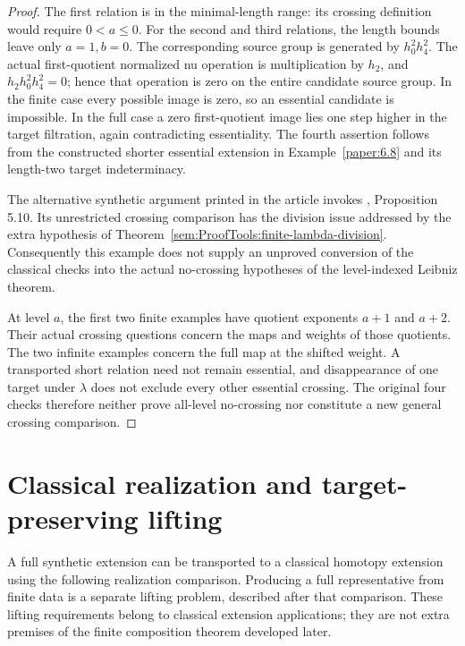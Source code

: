 \begin{proof}
The first relation is in the minimal-length range: its crossing definition would require $0<a\leq0$. For the second and third relations, the length bounds leave only $a=1,b=0$. The corresponding source group is generated by $h_0^2h_4^2$. The actual first-quotient normalized nu operation is multiplication by $h_2$, and $h_2h_0^2h_4^2=0$; hence that operation is zero on the entire candidate source group. In the finite case every possible image is zero, so an essential candidate is impossible. In the full case a zero first-quotient image lies one step higher in the target filtration, again contradicting essentiality. The fourth assertion follows from the constructed shorter essential extension in Example~\ref{paper:6.8} and its length-two target indeterminacy.

The alternative synthetic argument printed in the article invokes
\cite{LWX126}, Proposition 5.10. Its unrestricted crossing comparison
has the division issue addressed by the extra hypothesis of
Theorem~\ref{sem:ProofTools:finite-lambda-division}. Consequently this
example does not supply an unproved conversion of the classical checks
into the actual no-crossing hypotheses of the level-indexed Leibniz theorem.

At level $a$, the first two finite examples have quotient exponents
$a+1$ and $a+2$. Their actual crossing questions concern the maps
and weights of those quotients. The two infinite examples concern
the full map at the shifted weight. A transported short relation
need not remain essential, and disappearance of one target under
$\lambda$ does not exclude every other essential crossing.
The original four checks therefore neither prove all-level
no-crossing nor constitute a new general crossing comparison.
\end{proof}

\section{Classical realization and target-preserving lifting}

A full synthetic extension can be transported to a classical homotopy
extension using the following realization comparison. Producing a full
representative from finite data is a separate lifting problem, described
after that comparison. These lifting requirements belong to classical
extension applications; they are not extra premises of the finite
composition theorem developed later.

